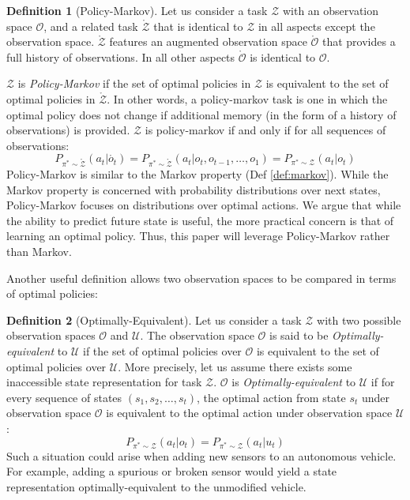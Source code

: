 \documentclass{article} %
\theoremstyle{definition}
\newtheorem{definition}{Definition}[section]
\begin{document}
\begin{definition}[Policy-Markov]
Let us consider a task $\mathcal{Z}$ with an observation space
$\mathcal{O}$, and a related task $\mathring{\mathcal{Z}}$ that is
identical to $\mathcal{Z}$ in all aspects except the observation
space. $\mathring{\mathcal{Z}}$ features an augmented observation
space $\mathring{\mathcal{O}}$ that provides a full history of
observations. In all other aspects $\mathring{\mathcal{O}}$ is
identical to $\mathcal{O}$.

$\mathcal{Z}$ is \textit{Policy-Markov} if the set of optimal policies
in $\mathcal{Z}$ is equivalent to the set of optimal policies in
$\mathring{\mathcal{Z}}$. In other words, a policy-markov task is one
in which the optimal policy does not change if additional memory (in
the form of a history of observations) is provided. $\mathcal{Z}$ is
policy-markov if and only if for all sequences of observations:
\[
P_{\pi^* \sim \mathring{\mathcal{Z}}}(a_t | \mathring{o_{t}}) = P_{\pi^* \sim \mathring{\mathcal{Z}}}(a_t | o_{t}, o_{t-1}, \dots, o_{1}) = P_{\pi^* \sim \mathcal{Z}}(a_t | o_{t})
\]
Policy-Markov is similar to the Markov property (Def
\ref{def:markov}). While the Markov property is concerned with
probability distributions over next states, Policy-Markov focuses on
distributions over optimal actions. We argue that while the ability to
predict future state is useful, the more practical concern is that of
learning an optimal policy. Thus, this paper will leverage
Policy-Markov rather than Markov.
\end{definition}

Another useful definition allows two observation spaces to be compared
in terms of optimal policies:

\begin{definition}[Optimally-Equivalent]
Let us consider a task $\mathcal{Z}$ with two possible observation
spaces $\mathcal{O}$ and $\mathcal{U}$. The observation space
$\mathcal{O}$ is said to be \textit{Optimally-equivalent} to
$\mathcal{U}$ if the set of optimal policies over $\mathcal{O}$ is
equivalent to the set of optimal policies over $\mathcal{U}$. More
precisely, let us assume there exists some inaccessible state
representation for task $\mathcal{Z}$. $\mathcal{O}$ is
\textit{Optimally-equivalent} to $\mathcal{U}$ if for every sequence
of states $(s_1, s_2, \dots, s_t)$, the optimal action from state
$s_t$ under observation space $\mathcal{O}$ is equivalent to the
optimal action under observation space $\mathcal{U}$:
\[
P_{\pi^* \sim \mathcal{Z}}(a_t | o_{t}) = P_{\pi^* \sim {\mathcal{Z}}}(a_t | u_{t})
\]
Such a situation could arise when adding new sensors to an autonomous
vehicle. For example, adding a spurious or broken sensor would yield a
state representation optimally-equivalent to the unmodified vehicle.
\end{definition}
\end{document}
